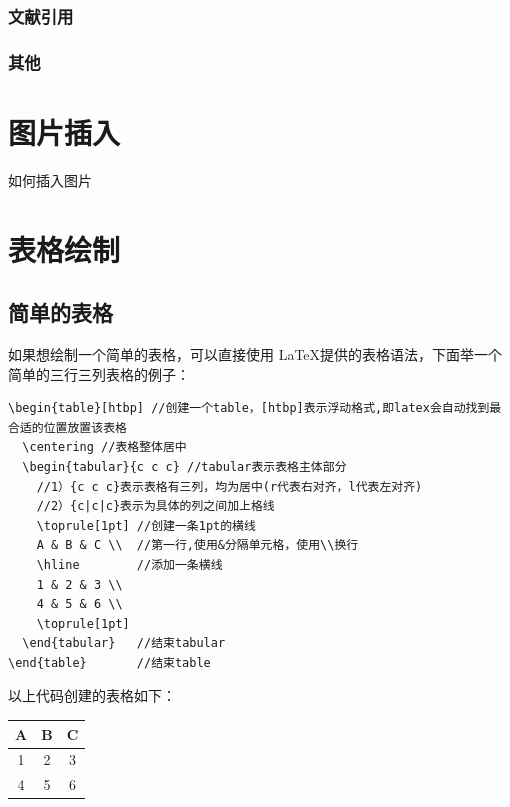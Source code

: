 \documentclass[AutoFakeBold]{ZafuThesis}
\begin{document}
\subsubsection{文献引用}


\subsubsection{其他}


\section{图片插入}
如何插入图片
\section{表格绘制}
\subsection{简单的表格}
如果想绘制一个简单的表格，可以直接使用 \LaTeX 提供的表格语法，下面举一个简单的三行三列表格的例子：
\begin{lstlisting}
\begin{table}[htbp] //创建一个table，[htbp]表示浮动格式,即latex会自动找到最合适的位置放置该表格
  \centering //表格整体居中
  \begin{tabular}{c c c} //tabular表示表格主体部分
    //1）{c c c}表示表格有三列，均为居中(r代表右对齐，l代表左对齐)
    //2）{c|c|c}表示为具体的列之间加上格线
    \toprule[1pt] //创建一条1pt的横线
    A & B & C \\  //第一行,使用&分隔单元格，使用\\换行
    \hline        //添加一条横线
    1 & 2 & 3 \\
    4 & 5 & 6 \\
    \toprule[1pt]
  \end{tabular}   //结束tabular
\end{table}       //结束table
\end{lstlisting}
\par 以上代码创建的表格如下：
\begin{table}[htbp] 
  \centering 
  \begin{tabular}{c c c}
    \toprule[1pt] 
    A & B & C \\  
    \hline       
    1 & 2 & 3 \\
    4 & 5 & 6 \\
    \toprule[1pt]
  \end{tabular} 
\end{table} 
\end{document}
